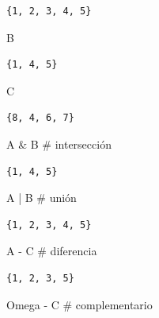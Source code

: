 \documentclass[
  letterpaper,
  DIV=11,
  numbers=noendperiod]{scrreprt}
\newenvironment{Shaded}{\begin{snugshade}}{\end{snugshade}}
\newcommand{\CommentTok}[1]{\textcolor[rgb]{0.37,0.37,0.37}{#1}}
\newcommand{\NormalTok}[1]{\textcolor[rgb]{0.00,0.23,0.31}{#1}}
\newcommand{\OperatorTok}[1]{\textcolor[rgb]{0.37,0.37,0.37}{#1}}
\begin{document}
\begin{verbatim}
{1, 2, 3, 4, 5}
\end{verbatim}

\begin{Shaded}
\begin{Highlighting}[]
\NormalTok{B}
\end{Highlighting}
\end{Shaded}

\begin{verbatim}
{1, 4, 5}
\end{verbatim}

\begin{Shaded}
\begin{Highlighting}[]
\NormalTok{C}
\end{Highlighting}
\end{Shaded}

\begin{verbatim}
{8, 4, 6, 7}
\end{verbatim}

\begin{Shaded}
\begin{Highlighting}[]
\NormalTok{A }\OperatorTok{\&}\NormalTok{ B   }\CommentTok{\# intersección}
\end{Highlighting}
\end{Shaded}

\begin{verbatim}
{1, 4, 5}
\end{verbatim}

\begin{Shaded}
\begin{Highlighting}[]
\NormalTok{A }\OperatorTok{|}\NormalTok{ B   }\CommentTok{\# unión}
\end{Highlighting}
\end{Shaded}

\begin{verbatim}
{1, 2, 3, 4, 5}
\end{verbatim}

\begin{Shaded}
\begin{Highlighting}[]
\NormalTok{A }\OperatorTok{{-}}\NormalTok{ C   }\CommentTok{\# diferencia}
\end{Highlighting}
\end{Shaded}

\begin{verbatim}
{1, 2, 3, 5}
\end{verbatim}

\begin{Shaded}
\begin{Highlighting}[]
\NormalTok{Omega }\OperatorTok{{-}}\NormalTok{ C }\CommentTok{\# complementario}
\end{Highlighting}
\end{Shaded}
\end{document}
